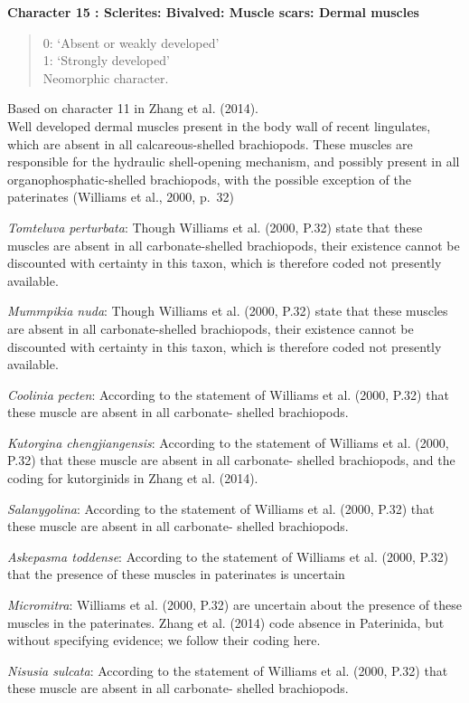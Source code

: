 \documentclass[]{book}
\theoremstyle{definition}
\theoremstyle{definition}
\theoremstyle{definition}
\theoremstyle{remark}
\begin{document}
\textbf{Character 15 : Sclerites: Bivalved: Muscle scars: Dermal muscles
}

\begin{quote}
0: `Absent or weakly developed'\\
1: `Strongly developed'\\
Neomorphic character.
\end{quote}

Based on character 11 in Zhang et al. (2014).\\
Well developed dermal muscles present in the body wall of recent
lingulates, which are absent in all calcareous-shelled brachiopods.
These muscles are responsible for the hydraulic shell-opening mechanism,
and possibly present in all organophosphatic-shelled brachiopods, with
the possible exception of the paterinates (Williams et al., 2000, p.~32)

\emph{Tomteluva perturbata}: Though Williams et al. (2000, P.32) state
that these muscles are absent in all carbonate-shelled brachiopods,
their existence cannot be discounted with certainty in this taxon, which
is therefore coded not presently available.

\emph{Mummpikia nuda}: Though Williams et al. (2000, P.32) state that
these muscles are absent in all carbonate-shelled brachiopods, their
existence cannot be discounted with certainty in this taxon, which is
therefore coded not presently available.

\emph{Coolinia pecten}: According to the statement of Williams et al.
(2000, P.32) that these muscle are absent in all carbonate- shelled
brachiopods.

\emph{Kutorgina chengjiangensis}: According to the statement of Williams
et al. (2000, P.32) that these muscle are absent in all carbonate-
shelled brachiopods, and the coding for kutorginids in Zhang et al.
(2014).

\emph{Salanygolina}: According to the statement of Williams et al.
(2000, P.32) that these muscle are absent in all carbonate- shelled
brachiopods.

\emph{Askepasma toddense}: According to the statement of Williams et al.
(2000, P.32) that the presence of these muscles in paterinates is
uncertain

\emph{Micromitra}: Williams et al. (2000, P.32) are uncertain about the
presence of these muscles in the paterinates. Zhang et al. (2014) code
absence in Paterinida, but without specifying evidence; we follow their
coding here.

\emph{Nisusia sulcata}: According to the statement of Williams et al.
(2000, P.32) that these muscle are absent in all carbonate- shelled
brachiopods.
\end{document}
